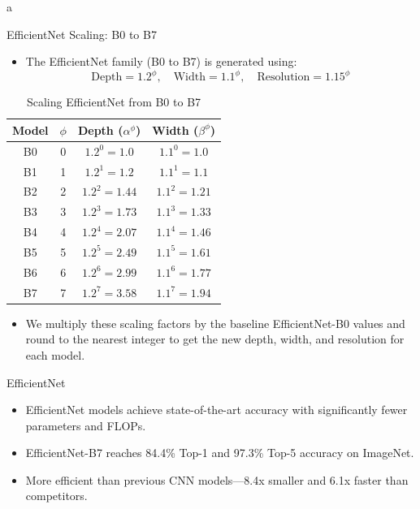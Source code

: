 a\documentclass[10pt]{beamer}
\theoremstyle{remark}
\theoremstyle{definition}
\begin{document}
\begin{frame}{EfficientNet Scaling: B0 to B7}
\begin{itemize}
    \item The EfficientNet family (B0 to B7) is generated using:
    \[
    \text{Depth} = 1.2^\phi, \quad
    \text{Width} = 1.1^\phi, \quad
    \text{Resolution} = 1.15^\phi
    \]
\end{itemize}

\begin{table}[]
    \centering
    \begin{tabular}{|c|c|c|c|}
        \hline
        \textbf{Model} & \(\phi\) & \textbf{Depth} (\(\alpha^\phi\)) & \textbf{Width} (\(\beta^\phi\)) \\ 
        \hline
        B0 & 0 & \(1.2^0 = 1.0\) & \(1.1^0 = 1.0\)  \\ 
        B1 & 1 & \(1.2^1 = 1.2\) & \(1.1^1 = 1.1\)  \\ 
        B2 & 2 & \(1.2^2 = 1.44\) & \(1.1^2 = 1.21\)  \\ 
        B3 & 3 & \(1.2^3 = 1.73\) & \(1.1^3 = 1.33\)  \\ 
        B4 & 4 & \(1.2^4 = 2.07\) & \(1.1^4 = 1.46\)  \\ 
        B5 & 5 & \(1.2^5 = 2.49\) & \(1.1^5 = 1.61\)  \\ 
        B6 & 6 & \(1.2^6 = 2.99\) & \(1.1^6 = 1.77\)  \\ 
        B7 & 7 & \(1.2^7 = 3.58\) & \(1.1^7 = 1.94\)  \\ 
        \hline
    \end{tabular}
    \caption{Scaling EfficientNet from B0 to B7}
\end{table}

\begin{itemize}
\item We multiply these scaling factors by the baseline EfficientNet-B0 values and round to the nearest integer to get the new depth, width, and resolution for each model.
\end{itemize}


\end{frame}


\begin{frame}{EfficientNet}

\begin{itemize}
    \item EfficientNet models achieve state-of-the-art accuracy with significantly fewer parameters and FLOPs.        \pause

    \item EfficientNet-B7 reaches 84.4\% Top-1 and 97.3\% Top-5 accuracy on ImageNet.
    \pause

    \item More efficient than previous CNN models---8.4x smaller and 6.1x faster than competitors.
\end{itemize}
\end{frame}
\end{document}
